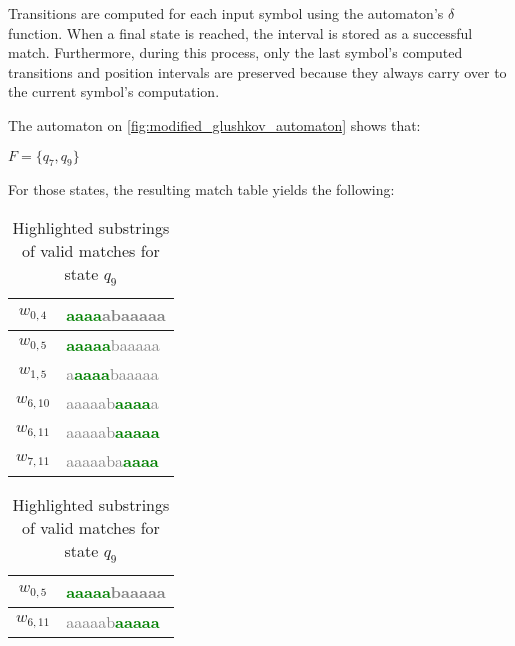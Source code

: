 Transitions are computed for each input symbol using the automaton's $\delta$ function. When a final state is reached, the interval is stored as a successful match. Furthermore, during this process, only the last symbol's computed transitions and position intervals are preserved because they always carry over to the current symbol's computation.

The automaton on \ref{fig:modified_glushkov_automaton} shows that:

\begin{center}
	$F = \{q_7, q_9\}$
\end{center}

For those states, the resulting match table yields the following:

\begin{table}[H]
	\centering
	\renewcommand{\arraystretch}{1.2}
	
	\begin{minipage}[t]{0.48\textwidth}
		\centering
		\begin{tabular}{|c|>{\ttfamily}l|}
			\hline
			$w_{0,4}$  & \textbf{\textcolor{green}{aaaa}}\textcolor{gray}{abaaaaa} \\ \hline
			$w_{0,5}$  & \textbf{\textcolor{green}{aaaaa}}\textcolor{gray}{baaaaa} \\ \hline
			$w_{1,5}$  & \textcolor{gray}{a}\textbf{\textcolor{green}{aaaa}}\textcolor{gray}{baaaaa} \\ \hline
			$w_{6,10}$ & \textcolor{gray}{aaaaab}\textbf{\textcolor{green}{aaaa}}\textcolor{gray}{a} \\ \hline
			$w_{6,11}$ & \textcolor{gray}{aaaaab}\textbf{\textcolor{green}{aaaaa}} \\ \hline
			$w_{7,11}$ & \textcolor{gray}{aaaaaba}\textbf{\textcolor{green}{aaaa}} \\ \hline
		\end{tabular}
		\caption{Highlighted substrings of valid matches for state $q_7$}
		\label{tab:left-highlights}
	\end{minipage}\hfill
		\begin{minipage}[t]{0.48\textwidth}
		\centering
		\begin{tabular}{|c|>{\ttfamily}l|}
			\hline
			$w_{0,5}$  & \textbf{\textcolor{green}{aaaaa}}\textcolor{gray}{baaaaa} \\ \hline
			$w_{6,11}$ & \textcolor{gray}{aaaaab}\textbf{\textcolor{green}{aaaaa}} \\ \hline
		\end{tabular}
		\caption{Highlighted substrings of valid matches for state $q_9$}
		\label{tab:left-highlights1}
	\end{minipage}
\end{table}

